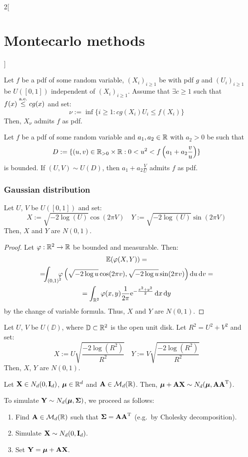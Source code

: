 \documentclass[../../../main_math.tex]{subfiles}
\begin{document}
\begin{multicols}{2}[\section{Montecarlo methods}]
\begin{proposition}
    Let $f$ be a pdf of some random variable, ${(X_i)}_{i\geq 1}$ be \iid with pdf $g$ and ${(U_i)}_{i\geq 1}$ be \iid $U([0,1])$ independent of ${(X_i)}_{i\geq 1}$. Assume that $\exists c\geq 1$ such that $f(x)\overset{\text{a.e.}}{\leq} cg(x)$ and set:
    $$
      \nu := \inf\{ i\geq 1 : cg(X_i)U_i\leq f(X_i)\}
    $$
    Then, $X_\nu$ admits $f$ as pdf.
  \end{proposition}
  \begin{proposition}
    Let $f$ be a pdf of some random variable and $a_1,a_2\in\mathbb{R}$ with $a_2>0$ be such that
    $$
      D:=\{ (u,v)\in\mathbb{R}_{>0}\times \mathbb{R}:0<u^2<f\left(a_1+a_2\frac{v}{u}\right)\}
    $$
    is bounded. If $(U,V)\sim U(D)$, then $a_1+a_2\frac{V}{U}$ admits $f$ as pdf.
  \end{proposition}
  \subsubsection{Gaussian distribution}
  \begin{proposition}
    Let $U$, $V$ be \iid $U([0,1])$ and set:
    $$
      X:=\sqrt{-2\log(U)}\cos(2\pi V)\quad Y:=\sqrt{-2\log(U)}\sin(2\pi V)
    $$
    Then, $X$ and $Y$ are \iid $N(0,1)$.
  \end{proposition}
  \begin{proof}
    Let $\varphi:\mathbb{R}^2\to\mathbb{R}$ be bounded and measurable. Then:
    \begin{multline*}
      \mathbb{E}(\varphi(X,Y))=\\=\!\!\!\int_{{(0,1)}^2}\!\!\!\!\varphi\left( \sqrt{-2\log u} \cos(2\pi v), \sqrt{-2\log u} \sin(2\pi v)\right)\dd{u}\dd{v}=\\=\int_{\mathbb{R}^2}\varphi(x,y) \frac{1}{2\pi}\mathrm{e}^{-\frac{x^2+y^2}{2}}\dd{x}\dd{y}
    \end{multline*}
    by the change of variable formula. Thus, $X$ and $Y$ are \iid $N(0,1)$.
  \end{proof}
  \begin{proposition}
    Let $U$, $V$ be \iid $U(\DD)$, where $\mathbb{D}\subset \mathbb{R}^2$ is the open unit disk. Let $R^2=U^2+V^2$ and set:
    $$
      X:=U\sqrt{\frac{-2\log(R^2)}{R^2}}\quad Y:=V\sqrt{\frac{-2\log(R^2)}{R^2}}
    $$
    Then, $X$, $Y$ are \iid $N(0,1)$.
  \end{proposition}
  \begin{proposition}
    Let $\boldsymbol{\mathrm{X}}\in N_d(0,\boldsymbol{\mathrm{I}}_d)$, $\boldsymbol{\mathrm{\mu}}\in\mathbb{R}^d$ and $\boldsymbol{\mathrm{A}}\in\mathcal{M}_d(\mathbb{R})$. Then, $\boldsymbol{\mathrm{\mu}}+\boldsymbol{\mathrm{AX}}\sim N_d(\boldsymbol{\mathrm{\mu}},\boldsymbol{\mathrm{A}}{\boldsymbol{\mathrm{A}}}^{\mathrm{T}})$.
  \end{proposition}
  \begin{remark}
    To simulate $\boldsymbol{\mathrm{Y}}\sim N_d(\boldsymbol{\mathrm{\mu}},\boldsymbol{\mathrm{\Sigma}})$, we proceed as follows:
    \begin{enumerate}
      \item Find $\boldsymbol{\mathrm{A}}\in\mathcal{M}_d(\mathbb{R})$ such that $\boldsymbol{\mathrm{\Sigma}}=\boldsymbol{\mathrm{A}}{\boldsymbol{\mathrm{A}}}^{\mathrm{T}}$ (e.g.\ by Cholesky decomposition).
      \item Simulate $\boldsymbol{\mathrm{X}}\sim N_d(0,\boldsymbol{\mathrm{I}}_d)$.
      \item Set $\boldsymbol{\mathrm{Y}}=\boldsymbol{\mathrm{\mu}}+\boldsymbol{\mathrm{AX}}$.
    \end{enumerate}
  \end{remark}

\end{multicols}
\end{document}
